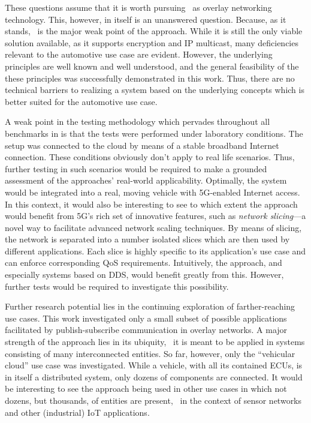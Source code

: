 These questions assume that it is worth pursuing \wnet\ as overlay networking technology. This, however, in itself is an unanswered question. Because, as it stands, \wnet\ is the major weak point of the approach. While it is still the only viable solution available, as it supports encryption and IP multicast, many deficiencies relevant to the automotive use case are evident. However, the underlying principles are well known and well understood, and the general feasibility of the these principles was successfully demonstrated in this work. Thus, there are no technical barriers to realizing a system based on the underlying concepts which is better suited for the automotive use case.

A weak point in the testing methodology which pervades throughout all benchmarks in  is that the tests were performed under laboratory conditions. The setup was connected to the cloud by means of a stable broadband Internet connection. These conditions obviously don't apply to real life scenarios. Thus, further testing in such scenarios would be required to make a grounded assessment of the approaches' real-world applicability. Optimally, the system would be integrated into a real, moving vehicle with 5G-enabled Internet access. In this context, it would also be interesting to see to which extent the approach would benefit from 5G's rich set of innovative features, such as \emph{network slicing}---a novel way to facilitate advanced network scaling techniques. By means of slicing, the network is separated into a number isolated slices which are then used by different applications. Each slice is highly specific to its application's use case and can enforce corresponding QoS requirements. Intuitively, the approach, and especially systems based on DDS, would benefit greatly from this. However, further tests would be required to investigate this possibility.

Further research potential lies in the continuing exploration of farther-reaching use cases. This work investigated only a small subset of possible applications facilitated by publish-subscribe communication in overlay networks. A major strength of the approach lies in its ubiquity, \ie\ it is meant to be applied in systems consisting of many interconnected entities. So far, however, only the ``vehicular cloud'' use case was investigated. While a vehicle, with all its contained ECUs, is in itself a distributed system, only dozens of components are connected. It would be interesting to see the approach being used in other use cases in which not dozens, but thousands, of entities are present, \eg\ in the context of sensor networks and other (industrial) IoT applications.

